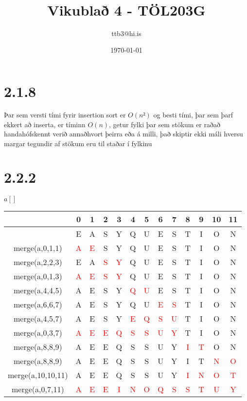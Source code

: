 \documentclass{article}
\title{Vikublað 4 - TÖL203G}
\author{ttb3@hi.is}
\date{\today}
\begin{document}
\maketitle


\section*{2.1.8}
Þar sem versti tími fyrir insertion sort er $O(n²)$ og besti tími, 
þar sem þarf ekkert að inserta, er tíminn $O(n)$, getur fylki þar sem stökum er raðað 
handahófskennt verið annaðhvort þeirra eða á milli, það skiptir ekki máli hversu margar tegundir 
af stökum eru til staðar í fylkinu

\section*{2.2.2}
\begin{center}
    $a[]$\\
    \begin{tabular}{|c|c|c|c|c|c|c|c|c|c|c|c|c|}
        \hline
        &0&1&2&3&4&5&6&7&8&9&10&11\\
        \hline
        &E&A&S&Y&Q&U&E&S&T&I&O&N\\
        \hline
        merge(a,0,1,1)&\textcolor{red}{A}&\textcolor{red}{E}&S&Y&Q&U&E&S&T&I&O&N\\
        \hline
        merge(a,2,2,3)&E&A&\textcolor{red}{S}&\textcolor{red}{Y}&Q&U&E&S&T&I&O&N\\
        \hline
        merge(a,0,1,3)&\textcolor{red}{A}&\textcolor{red}{E}&\textcolor{red}{S}&\textcolor{red}{Y}&Q&U&E&S&T&I&O&N\\
        \hline
        merge(a,4,4,5)&A&E&S&Y&\textcolor{red}{Q}&\textcolor{red}{U}&E&S&T&I&O&N\\
        \hline
        merge(a,6,6,7)&A&E&S&Y&Q&U&\textcolor{red}{E}&\textcolor{red}{S}&T&I&O&N\\
        \hline
        merge(a,4,5,7)&A&E&S&Y&\textcolor{red}{E}&\textcolor{red}{Q}&\textcolor{red}{S}&\textcolor{red}{U}&T&I&O&N\\
        \hline
        merge(a,0,3,7)&\textcolor{red}{A}&\textcolor{red}{E}&\textcolor{red}{E}&\textcolor{red}{Q}&\textcolor{red}{S}&\textcolor{red}{S}&\textcolor{red}{U}&\textcolor{red}{Y}&T&I&O&N\\
        \hline
        merge(a,8,8,9)&A&E&E&Q&S&S&U&Y&\textcolor{red}{I}&\textcolor{red}{T}&O&N\\
        \hline
        merge(a,8,8,9)&A&E&E&Q&S&S&U&Y&I&T&\textcolor{red}{N}&\textcolor{red}{O}\\
        \hline
        merge(a,10,10,11)&A&E&E&Q&S&S&U&Y&\textcolor{red}{I}&\textcolor{red}{N}&\textcolor{red}{O}&\textcolor{red}{T}\\
        \hline
        merge(a,0,7,11)&\textcolor{red}{A}&\textcolor{red}{E}&\textcolor{red}{E}&\textcolor{red}{I}&\textcolor{red}{N}&\textcolor{red}{O}&\textcolor{red}{Q}&\textcolor{red}{S}&\textcolor{red}{S}&\textcolor{red}{T}&\textcolor{red}{U}&\textcolor{red}{Y}\\
        \hline
    \end{tabular}
\end{center}
\end{document}
